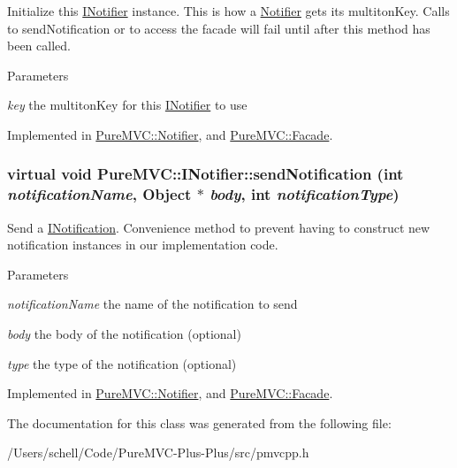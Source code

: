 Initialize this \hyperlink{class_pure_m_v_c_1_1_i_notifier}{INotifier} instance. This is how a \hyperlink{class_pure_m_v_c_1_1_notifier}{Notifier} gets its multitonKey. Calls to sendNotification or to access the facade will fail until after this method has been called.


\begin{DoxyParams}{Parameters}
\item[{\em key}]the multitonKey for this \hyperlink{class_pure_m_v_c_1_1_i_notifier}{INotifier} to use \end{DoxyParams}


Implemented in \hyperlink{class_pure_m_v_c_1_1_notifier_a6910365c70415ba7973401215f57e4af}{PureMVC::Notifier}, and \hyperlink{class_pure_m_v_c_1_1_facade_a94c72ff29f9f42ff084f247b180fb4ad}{PureMVC::Facade}.\hypertarget{class_pure_m_v_c_1_1_i_notifier_a65e8333ccfea74138b79f84dac96af25}{
\subsubsection[{sendNotification}]{\setlength{\rightskip}{0pt plus 5cm}virtual void PureMVC::INotifier::sendNotification (int {\em notificationName}, \/  {\bf Object} $\ast$ {\em body}, \/  int {\em notificationType})}}
\label{class_pure_m_v_c_1_1_i_notifier_a65e8333ccfea74138b79f84dac96af25}


Send a {\ttfamily \hyperlink{class_pure_m_v_c_1_1_i_notification}{INotification}}. Convenience method to prevent having to construct new notification instances in our implementation code.


\begin{DoxyParams}{Parameters}
\item[{\em notificationName}]the name of the notification to send \item[{\em body}]the body of the notification (optional) \item[{\em type}]the type of the notification (optional) \end{DoxyParams}


Implemented in \hyperlink{class_pure_m_v_c_1_1_notifier_a55a358ee2661ecc08400653016fdb497}{PureMVC::Notifier}, and \hyperlink{class_pure_m_v_c_1_1_facade_a39a61e0a65d0f979848d36fe99cfd5f5}{PureMVC::Facade}.

The documentation for this class was generated from the following file:\begin{DoxyCompactItemize}
\item 
/Users/schell/Code/PureMVC-\/Plus-\/Plus/src/pmvcpp.h\end{DoxyCompactItemize}
